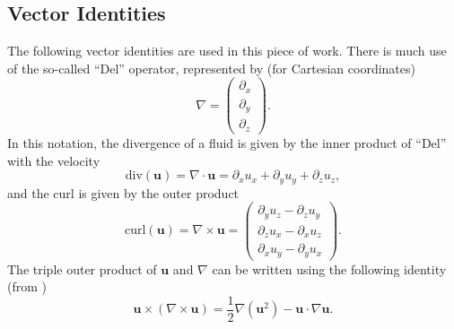 \documentclass[10pt, a4paper]{article}
\numberwithin{equation}{section}
\newcommand{\vel}{\bm{u}}
\newcommand{\del}{\nabla}
\newcommand{\deldot}{\nabla \cdot}
\newcommand{\delcross}{\nabla \times}
\newcommand{\inv}[1]{\frac{1}{#1}}
\begin{document}
\subsection{Vector Identities}
The following vector identities are used in this piece of work.
There is much use of the so-called ``Del'' operator, represented by (for Cartesian coordinates)
\begin{equation}
\label{eq:deldef}
\del=\left(\begin{array}{c} \partial_{x}\\\partial_{y}\\\partial_{z}\end{array}\right).
\end{equation}
In this notation, the divergence of a fluid is given by the inner product of ``Del'' with the velocity
\begin{equation}
\label{eq:divdef}
\mbox{div} (\vel) = \deldot \vel = \partial_x u_x + \partial_y u_y + \partial_z u_z,
\end{equation}
and the curl is given by the outer product
\begin{equation}
\label{eq:curldef}
\mbox{curl} (\vel) = \delcross \vel = \left(\begin{array}{c} \partial_y u_z -\partial_z u_y\\\partial_z u_x - \partial_x u_z\\\partial_x u_y - \partial_y u_x\end{array}\right).
\end{equation}
The triple outer product of $\vel$ and $\del$ can be written using the following identity (from \citet{harlen14c6})
\begin{equation}
\label{eq:vecid1}
\vel\times (\delcross \vel)=\inv{2}\del(\vel^2) -\vel\cdot\del\vel.
\end{equation}
\clearpage
\end{document}
